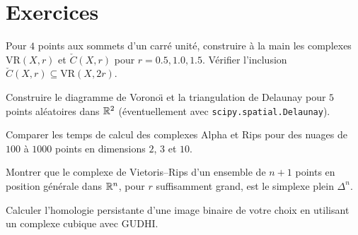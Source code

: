 \section{Exercices}

\begin{exercice}
Pour $4$ points aux sommets d'un carr\'e unit\'e, construire \`a la
main les complexes $\mathrm{VR}(X, r)$ et $\check{C}(X, r)$ pour
$r = 0.5, 1.0, 1.5$. V\'erifier l'inclusion
$\check{C}(X, r) \subseteq \mathrm{VR}(X, 2r)$.
\end{exercice}

\begin{exercice}
Construire le diagramme de Vorono\"{\i} et la triangulation de Delaunay
pour $5$ points al\'eatoires dans $\mathbb{R}^2$ (\'eventuellement avec
\texttt{scipy.spatial.Delaunay}).
\end{exercice}

\begin{exercice}
Comparer les temps de calcul des complexes Alpha et Rips pour des
nuages de $100$ \`a $1000$ points en dimensions $2$, $3$ et $10$.
\end{exercice}

\begin{exercice}
Montrer que le complexe de Vietoris--Rips d'un ensemble de $n+1$
points en position g\'en\'erale dans $\mathbb{R}^n$, pour $r$ suffisamment
grand, est le simplexe plein $\Delta^n$.
\end{exercice}

\begin{exercice}
Calculer l'homologie persistante d'une image binaire de votre choix
en utilisant un complexe cubique avec GUDHI.
\end{exercice}
